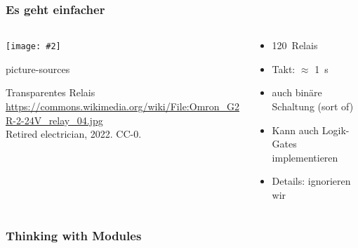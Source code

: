 \documentclass[t,aspectratio=169,usenames,dvipsnames]{beamer}
\newcommand{\sourcedimage}[5][width=\textwidth,height=0.7\textheight,keepaspectratio]{%
  \begin{center}
    \texttt{[image: \#2]}

    \expandafter\begin{collect}{picture-sources}{}{}
      \item[#3] \href{#4}{#4} \\ #5
    \end{collect}
  \end{center}
}
\begin{document}
\begin{frame}
  \frametitle{Es geht einfacher}

  \begin{columns}
    \begin{column}{.45\textwidth}
      \sourcedimage{relay-transparent}{Transparentes Relais}{https://commons.wikimedia.org/wiki/File:Omron\_G2R-2-24V\_relay\_04.jpg}{Retired electrician, 2022. CC-0.}
    \end{column}
    \begin{column}{.45\textwidth}
      \begin{itemize}
      \item \qty{120} Relais
      \item Takt: $\approx$ \qty{1}{\second}
      \end{itemize}

      \bigskip\pause

      \begin{itemize}
      \item auch binäre Schaltung (sort of)
      \item Kann auch Logik-Gates implementieren
      \item Details: ignorieren wir
      \end{itemize}
    \end{column}
  \end{columns}
\end{frame}

\begin{frame}
  \frametitle{Thinking with Modules}

  \strut{}

  \bigskip


\end{frame}
\end{document}
